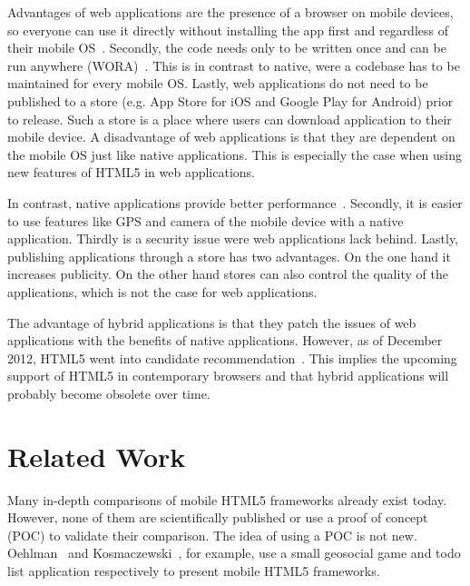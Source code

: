 \documentclass[a4paper]{artikel3}
\begin{document}
Advantages of web applications are the presence of a browser on mobile devices, so everyone can use it directly without installing the app first and regardless of their mobile OS~\cite{Accenture2012}.
Secondly, the code needs only to be written once and can be run anywhere (WORA)~\cite{Hales2012}.
This is in contrast to native, were a codebase has to be maintained for every mobile OS.
Lastly, web applications do not need to be published to a store (e.g. App Store for iOS and Google Play for Android) prior to release.
Such a store is a place where users can download application to their mobile device.
A disadvantage of web applications is that they are dependent on the mobile OS just like native applications.
This is especially the case when using new features of HTML5 in web applications.

In contrast, native applications provide better performance~\cite{Accenture2012}.
Secondly, it is easier to use features like GPS and camera of the mobile device with a native application.
Thirdly is a security issue were web applications lack behind.
Lastly, publishing applications through a store has two advantages.
On the one hand it increases publicity.
On the other hand stores can also control the quality of the applications, which is not the case for web applications.

The advantage of hybrid applications is that they patch the issues of web applications with the benefits of native applications.
However, as of December 2012, HTML5 went into candidate recommendation~\cite{Jacobs2012}.
This implies the upcoming support of HTML5 in contemporary browsers and that hybrid applications will probably become obsolete over time.


\section{Related Work} %
\label{sec:related-work}


Many in-depth comparisons of mobile HTML5 frameworks already exist today.  
However, none of them are scientifically published or use a proof of concept (POC) to validate their comparison.  
The idea of using a POC is not new.  
Oehlman~\cite{Oeflman2011} and Kosmaczewski~\cite{Kosmaczewski2012},  for example,  use a small geosocial game and todo list application respectively to present mobile HTML5 frameworks.
\end{document}
